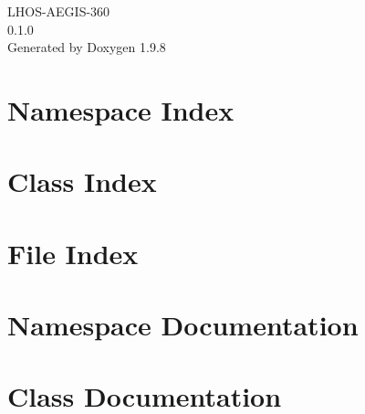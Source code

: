 \documentclass[twoside]{book}
\newcommand{\+}{\discretionary{\mbox{\scriptsize$\hookleftarrow$}}{}{}}
\newcommand{\clearemptydoublepage}{%
    \newpage{\pagestyle{empty}\cleardoublepage}%
  }
\begin{document}
  \raggedbottom
    \hypersetup{pageanchor=false,
                bookmarksnumbered=true,
                pdfencoding=unicode
               }
  \begin{titlepage}
  \vspace*{7cm}
  \begin{center}%
  {\Large LHOS-\/\+AEGIS-\/360}\\
  [1ex]\large 0.\+1.\+0 \\
  \vspace*{1cm}
  {\large Generated by Doxygen 1.9.8}\\
  \end{center}
  \end{titlepage}
  \clearemptydoublepage
  \tableofcontents
  \clearemptydoublepage
  \hypersetup{pageanchor=true}

\chapter{Namespace Index}

\chapter{Class Index}

\chapter{File Index}

\chapter{Namespace Documentation}



\chapter{Class Documentation}




\end{document}
